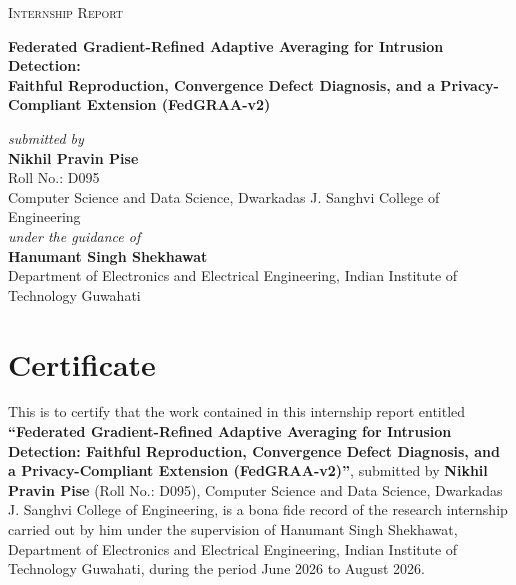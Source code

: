 \documentclass[11pt,a4paper]{report}
\begin{document}

\begin{titlepage}
\centering
{\large \textsc{Internship Report}}\\[1.6em]
{\LARGE\bfseries Federated Gradient-Refined Adaptive Averaging for Intrusion Detection:\\[0.35em]
Faithful Reproduction, Convergence Defect Diagnosis, and a Privacy-Compliant Extension (FedGRAA-v2)\par}
\vspace{1.8em}
{\large \textit{submitted by}}\\[0.5em]
{\large \textbf{Nikhil Pravin Pise}}\\
{Roll No.: D095}\\
{Computer Science and Data Science, Dwarkadas J. Sanghvi College of Engineering}\\[2.2em]
{\large \textit{under the guidance of}}\\[0.5em]
{\textbf{Hanumant Singh Shekhawat}}\\
{Department of Electronics and Electrical Engineering, Indian Institute of Technology Guwahati}\\[2.2em]
\end{titlepage}

\chapter*{Certificate}
\thispagestyle{plain}

{\sloppy
This is to certify that the work contained in this internship report entitled
\textbf{``Federated Gradient-Refined Adaptive Averaging for Intrusion
Detection: Faithful Reproduction, Convergence Defect Diagnosis, and a
Privacy-Compliant Extension (FedGRAA-v2)''}, submitted by \textbf{Nikhil
Pravin Pise} (Roll No.: D095), Computer Science and Data Science, Dwarkadas J. Sanghvi College of Engineering, is a bona fide record of the research internship carried out by
him under the supervision of Hanumant Singh Shekhawat, Department of Electronics and Electrical Engineering, Indian
Institute of Technology Guwahati, during the period June 2026 to August 2026.
\par}
\end{document}
